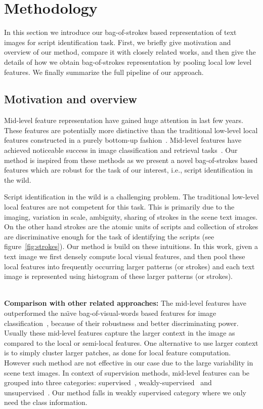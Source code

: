 \section{Methodology}
\label{sec:ourApp}
In this section we introduce our bag-of-strokes based representation of text images for script identification task. First, we briefly give motivation and overview of our method, compare it with closely related works, and then give the details of how we obtain bag-of-strokes representation by pooling local low level features. We finally summarize the full pipeline of our approach.

\subsection{Motivation and overview}
Mid-level feature representation have gained huge attention in last few years. These features are potentially more distinctive than the traditional low-level local features constructed in a purely bottom-up fashion~\cite{FernandoFT14}. Mid-level features have achieved noticeable success in image classification and retrieval tasks~\cite{JunejaVJZ13,BoureauBLP10,FernandoFT14}. Our method is inspired from these methods as we present a novel bag-of-strokes based features which are robust for the task of our interest, i.e., script identification in the wild. 

Script identification in the wild is a challenging problem. The traditional  low-level local features are not competent for this task. This is primarily due to the imaging, variation in scale, ambiguity, sharing of strokes in the scene text images. On the other hand strokes are the atomic units of scripts and collection of strokes are discriminative enough for the task of identifying the scripts (see figure~\ref{fig:strokes}). Our method is build on these intuitions. In this work, given a text image we first densely compute local visual features, and then pool these local features into frequently occurring larger patterns (or strokes) and each text image is represented using histogram of these larger patterns (or strokes). 
\\
\


\noindent\textbf{Comparison with other related approaches:} 
The mid-level features have outperformed the na\"{\i}ve bag-of-visual-words based features for image classification~\cite{JunejaVJZ13}, because of their
robustness and better discriminating power. Usually these mid-level
features capture the larger context in the image as compared to the local or semi-local features. One alternative to use larger context is to simply cluster larger patches, as done for local feature computation. However such method are not effective in our case due to the large variability in scene text images. In context of supervision methods, mid-level features can
be grouped into three categories: supervised~\cite{JunejaVJZ13}, weakly-supervised~\cite{FernandoFT14} and unsupervised~\cite{SinghGE12}. Our method falls in weakly supervised category where we only need the class information. 


